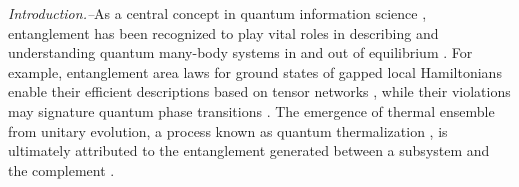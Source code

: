 \documentclass[twocolumn,english,prl,aps,superscriptaddress,amsmath,amssymb,floatfix]{revtex4-2}
\begin{document}
\maketitle


\emph{Introduction.--}As
a central concept in quantum information science \citep{nielsen00},
entanglement has been recognized to play vital roles in describing
and understanding quantum many-body systems in and out of equilibrium
\citep{Luigi2008,relation_entropy_Phase,Eisert2015,Abanin2019}. %
For example, entanglement area laws for ground states
of gapped local Hamiltonians enable their efficient descriptions based
on tensor networks \citep{RevModPhys.93.045003}, %
while their violations may signature %
quantum phase transitions \citep{Vidal2003,Calabrese2004}.%
The emergence of thermal ensemble from unitary evolution, a process
known as quantum thermalization \cite{Srednicki1994}, is ultimately attributed to the entanglement
generated between a subsystem and the complement \citep{Nandkishore2015}. %
\end{document}
